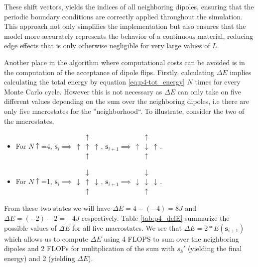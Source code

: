 \documentclass[../main_proj4_correct_template.tex]{subfiles}
\begin{document}
\noindent These shift vectors, yields the indices of all neighboring dipoles, ensuring that the periodic boundary conditions are correctly applied throughout the simulation. This approach not only simplifies the implementation but also ensures that the model more accurately represents the behavior of a continuous material, reducing edge effects that is only otherwise negligible for very large values of $L$.


Another place in the algorithm where computational costs can be avoided is in the computation of the acceptance of dipole flips. Firstly, calculating $\Delta E$ implies calculating the total energy by equation \eqref{eq:p4-tot_energy} $N$ times for every Monte Carlo cycle. However this is not necessary as $\Delta E$ can only take on five different values depending on the sum over the neighboring dipoles, i.e there are only five macrostates for the ''neighborhood``. To illustrate, consider the two of the macrostates,

\begin{itemize}
    \item For $N\uparrow$=4, $\mathbf{s}_i \implies \begin{matrix} & \uparrow & \\ \uparrow & \uparrow & \uparrow \\ & \uparrow & \end{matrix}$, 
    $\mathbf{s}_{i+1} \implies \begin{matrix}& \uparrow & \\ \uparrow & \downarrow & \uparrow \\ & \uparrow & \end{matrix}$.
    \item For $N\uparrow$=1, $\mathbf{s}_i \implies\begin{matrix} & \downarrow & \\ \downarrow & \uparrow & \downarrow \\ & \uparrow & \end{matrix}$, 
    $\mathbf{s}_{i+1} \implies \begin{matrix} & \downarrow & \\ \downarrow & \downarrow & \downarrow \\ & \uparrow &\end{matrix}$.    
\end{itemize}

\noindent From these two states we will have $\Delta E = 4 - (-4) = 8 J$ and $\Delta E = (-2) - 2 = -4 J$ respectively. Table \ref{tab:p4_delE} summarize the possible values of $\Delta E$ for all five macrostates. We see that $\Delta E = 2* E(\mathbf{s}_{i+1})$ which allows us to compute $\Delta E$ using 4 FLOPS to sum over the neighboring dipoles and 2 FLOPs for mulitplication of the sum with $s_k'$ (yielding the final energy) and 2 (yielding $\Delta E$).  
\end{document}
